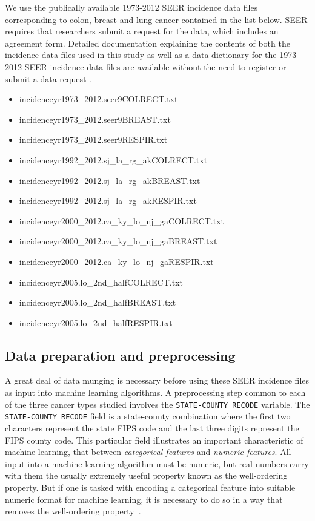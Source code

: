 \documentclass[a4paper,11pt]{article}
\newcommand{\codewhite}[1]{\colorbox{white}{\texttt{#1}}}
\begin{document}
We use the publically available 1973-2012 SEER incidence data files corresponding to colon, breast and lung cancer contained in the list below.
SEER requires that researchers submit a request for the data, which includes an agreement form. Detailed documentation explaining the contents of both the incidence data files used in this study as well as a data dictionary for the 1973-2012 SEER incidence data files are available without the need to register or submit a data request \cite{seerdoc}.
 

\begin{itemize}[noitemsep]
\item incidenceyr1973\_2012.seer9COLRECT.txt
\item incidenceyr1973\_2012.seer9BREAST.txt
\item incidenceyr1973\_2012.seer9RESPIR.txt
\item incidenceyr1992\_2012.sj\_la\_rg\_akCOLRECT.txt
\item incidenceyr1992\_2012.sj\_la\_rg\_akBREAST.txt
\item incidenceyr1992\_2012.sj\_la\_rg\_akRESPIR.txt
\item incidenceyr2000\_2012.ca\_ky\_lo\_nj\_gaCOLRECT.txt
\item incidenceyr2000\_2012.ca\_ky\_lo\_nj\_gaBREAST.txt
\item incidenceyr2000\_2012.ca\_ky\_lo\_nj\_gaRESPIR.txt
\item incidenceyr2005.lo\_2nd\_halfCOLRECT.txt
\item incidenceyr2005.lo\_2nd\_halfBREAST.txt
\item incidenceyr2005.lo\_2nd\_halfRESPIR.txt
\end{itemize}



\subsection{Data preparation and preprocessing}
\label{subsec:dataprep}

A great deal of data munging is necessary before using these SEER incidence files as input into machine learning algorithms. A preprocessing step common to each of the three cancer types studied involves the \codewhite{STATE-COUNTY RECODE} variable.
The \codewhite{STATE-COUNTY RECODE} field is a state-county combination where the first two characters represent the state FIPS code and the last three digits represent the FIPS county code.  
This particular field illustrates an important characteristic of machine learning, that between \textit{categorical features} and \textit{numeric features}. All input into a machine learning algorithm must be numeric, but real numbers carry with them the usually extremely useful property known as the well-ordering property. But if one is tasked with encoding a categorical feature into suitable numeric format for machine learning, it is necessary to do so in a way that removes the well-ordering property~\cite{bowles}. 
\end{document}
